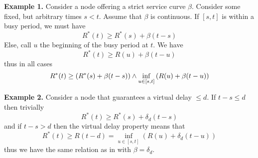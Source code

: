\textbf{Example 1.} Consider a node offering a strict service
curve $\beta$. Consider some fixed, but arbitrary times $s<t$.
Assume that $\beta$ is continuous. If $[s,t]$ is within a busy
period, we must have
 $$
 R^*(t) \geq R^*(s) + \beta (t-s)
 $$
Else, call $u$ the beginning of the busy period at $t$. We
have
$$
R^*(t) \geq R(u) + \beta(t-u)
$$
thus in all cases
\begin{equation}\mylabel{eq-introasc1}
 R^*(t) \geq \left( R^*(s) + \beta(t-s)\right) \wedge \inf_{u \in
[s,t] }\left(R(u) + \beta(t-u)\right)
\end{equation}

\textbf{Example 2.} Consider a node that guarantees a virtual
delay $\leq d$. If $t-s\leq d$ then trivially
$$
 R^*(t) \geq R^*(s) + \delta_d (t-s)
 $$
 and if $t-s >d$ then the virtual delay property means that
 $$
 R^*(t) \geq R(t-d)= \inf_{u \in
[s,t] }\left(R(u) + \delta_d(t-u)\right)
 $$
 thus we have the same relation as in 
with $\beta=\delta_d$.

